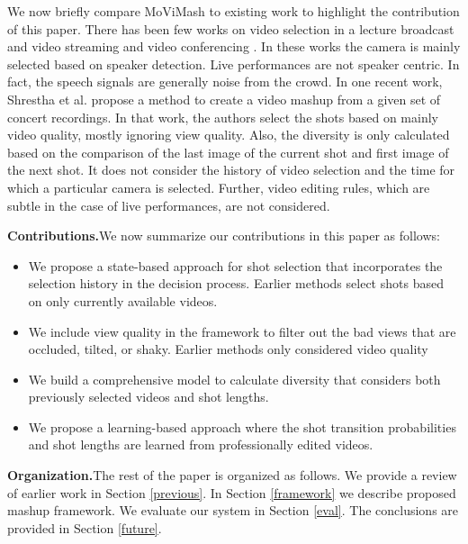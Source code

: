 \documentclass{sig-alternate}
\begin{document}
We now briefly compare MoViMash to existing work to highlight
the contribution of this paper. There has been few works on
video selection in a lecture broadcast and video streaming \cite{21}\cite{6} and video conferencing \cite{3}. In these works the camera is mainly selected based on speaker detection. Live performances are not speaker centric. In fact, the speech signals are generally noise from the crowd. In one recent work, Shrestha et al. \cite{15} propose a method to create a video mashup from a given set of concert recordings. In that work, the authors select the shots based on mainly video quality, mostly ignoring view quality. Also, the diversity is only calculated based on the comparison of the last image of the current shot and first image of the next shot. It does not consider the history of video selection and the time for which a particular camera is selected. Further, video editing rules, which are subtle in the case of live performances, are not considered.

\textbf{Contributions.}We now summarize our contributions in this paper
as follows:
\begin{itemize}
    \item We propose a state-based approach for shot selection that incorporates the selection history in the decision process. Earlier
methods select shots based on only currently available videos.
    \item We include view quality in the framework to filter out the bad views that are occluded, tilted, or shaky. Earlier methods only considered video quality 
    \item We build a comprehensive model to calculate diversity that considers both previously selected videos and shot lengths.
    \item We propose a learning-based approach where the shot transition probabilities and shot lengths are learned from professionally edited videos.
\end{itemize}

\textbf{Organization.}The rest of the paper is organized as follows.
We provide a review of earlier work in Section \ref{previous}. In Section \ref{framework} we describe proposed mashup framework. We evaluate our system in Section \ref{eval}. The conclusions are provided in Section \ref{future}.
\end{document}
